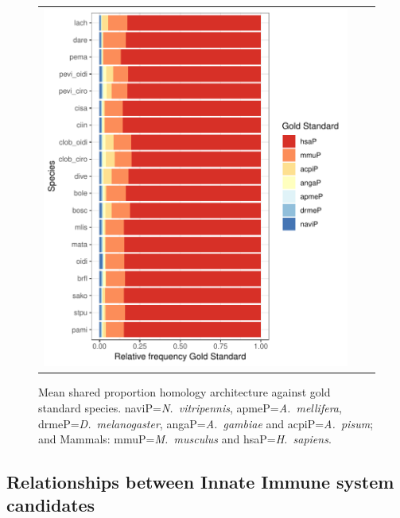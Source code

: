 \documentclass[11pt]{article}
\begin{document}
\begin{figure}
  \begin{tabular}{lcr}
    \begin{minipage}{0.6\textwidth}
    \centering
    \includegraphics[scale=0.7]{figures/proportionsGOLD}
    \end{minipage}
    & \qquad &
    \begin{minipage}{0.35\textwidth}
    \caption{Mean shared proportion homology architecture against 
      gold standard species. \textsf{naviP=}\textit{N.\ vitripennis}, 
      \textsf{apmeP=}\textit{A.\ mellifera}, \textsf{drmeP=}\textit{D.\ melanogaster}, 
      \textsf{angaP=}\textit{A.\ gambiae} and \textsf{acpiP=}\textit{A.\ pisum}; 
      and Mammals: \textsf{mmuP=}\textit{M.\ musculus} and 
    \textsf{hsaP=}\textit{H.\ sapiens}.}\label{fig:FrecEstrat}
    \end{minipage}
  \end{tabular}
\end{figure}

\subsection*{Relationships between Innate Immune system candidates}\label{Orthology}
\end{document}
